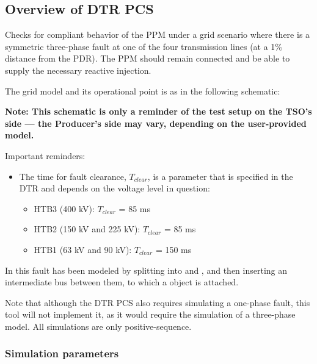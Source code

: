     \subsection{Overview of DTR PCS \DTRPcs}

    Checks for compliant behavior of the PPM under a grid scenario where there
    is a symmetric three-phase fault at one of the four transmission lines
    (at a 1\% distance from the PDR). The PPM should remain connected and
    be able to supply the necessary reactive injection.

    The grid model and its operational point is as in the following schematic:
    \begin{center}
        
    \end{center}
    \begin{center}
        \small \textbf{Note: This schematic is only a reminder of the test setup on the TSO's
        side --- the Producer's side may vary, depending on the user-provided model.}
    \end{center}

    \noindent Important reminders:
    \begin{itemize}
        \item The time for fault clearance, $T_{clear}$, is a parameter that
        is specified in the DTR and depends on the voltage level in
        question:
        \begin{itemize}
            \item HTB3 (400 kV): $T_{clear}$ = 85 ms
            \item HTB2 (150 kV and 225 kV): $T_{clear}$ = 85 ms
            \item HTB1 (63 kV and 90 kV): $T_{clear}$ = 150 ms
        \end{itemize}
    \end{itemize}

    In \Dynawo{} this fault has been modeled by splitting  into
     and , and then inserting an intermediate bus between
    them, to which a  object is attached.

    Note that although the DTR PCS also requires simulating a one-phase
    fault, this tool will not implement it, as it would require the
    simulation of a three-phase model. All simulations are only
    positive-sequence.


    \subsubsection{Simulation parameters}

